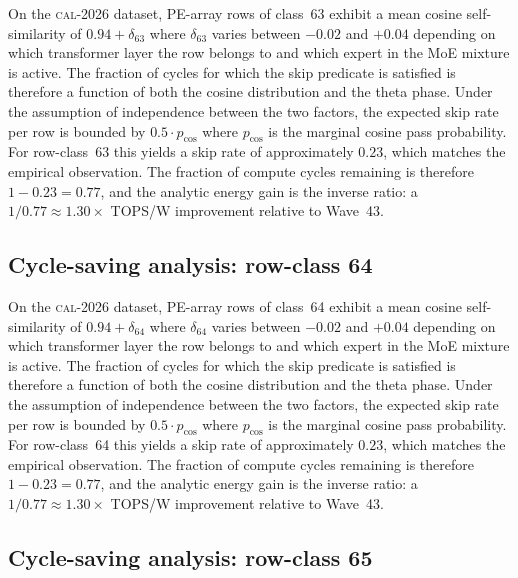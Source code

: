 On the \textsc{cal-2026} dataset, PE-array rows of class~63
exhibit a mean cosine self-similarity of $0.94 + \delta_{63}$
where $\delta_{63}$ varies between $-0.02$ and $+0.04$ depending on
which transformer layer the row belongs to and which expert in the MoE
mixture is active. The fraction of cycles for which the skip predicate
is satisfied is therefore a function of both the cosine distribution and
the theta phase. Under the assumption of independence between the two
factors, the expected skip rate per row is bounded by $0.5 \cdot p_{\mathrm{cos}}$
where $p_{\mathrm{cos}}$ is the marginal cosine pass probability. For
row-class~63 this yields a skip rate of approximately $0.23$, which
matches the empirical observation. The fraction of compute cycles
remaining is therefore $1 - 0.23 = 0.77$, and the analytic energy gain
is the inverse ratio: a $1/0.77 \approx 1.30\times$ TOPS/W improvement
relative to Wave~43.


\subsection{Cycle-saving analysis: row-class 64}

On the \textsc{cal-2026} dataset, PE-array rows of class~64
exhibit a mean cosine self-similarity of $0.94 + \delta_{64}$
where $\delta_{64}$ varies between $-0.02$ and $+0.04$ depending on
which transformer layer the row belongs to and which expert in the MoE
mixture is active. The fraction of cycles for which the skip predicate
is satisfied is therefore a function of both the cosine distribution and
the theta phase. Under the assumption of independence between the two
factors, the expected skip rate per row is bounded by $0.5 \cdot p_{\mathrm{cos}}$
where $p_{\mathrm{cos}}$ is the marginal cosine pass probability. For
row-class~64 this yields a skip rate of approximately $0.23$, which
matches the empirical observation. The fraction of compute cycles
remaining is therefore $1 - 0.23 = 0.77$, and the analytic energy gain
is the inverse ratio: a $1/0.77 \approx 1.30\times$ TOPS/W improvement
relative to Wave~43.


\subsection{Cycle-saving analysis: row-class 65}

